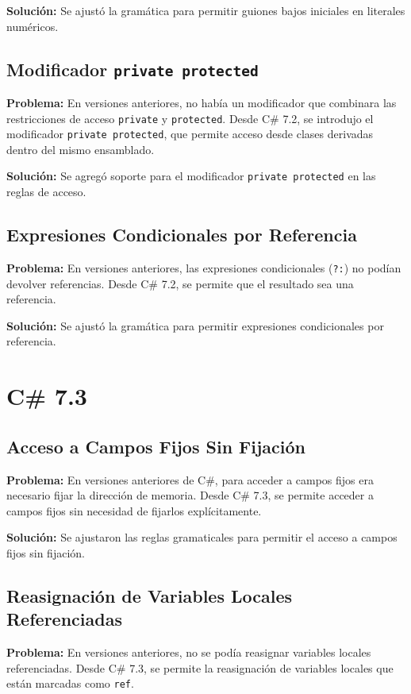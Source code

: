 \textbf{Solución:} Se ajustó la gramática para permitir guiones bajos iniciales en literales numéricos.

\subsection{Modificador \texttt{private protected}}
\textbf{Problema:} En versiones anteriores, no había un modificador que combinara las restricciones de acceso \texttt{private} y \texttt{protected}. Desde C\# 7.2, se introdujo el modificador \texttt{private protected}, que permite acceso desde clases derivadas dentro del mismo ensamblado.

\textbf{Solución:} Se agregó soporte para el modificador \texttt{private protected} en las reglas de acceso.

\subsection{Expresiones Condicionales por Referencia}
\textbf{Problema:} En versiones anteriores, las expresiones condicionales (\texttt{?:}) no podían devolver referencias. Desde C\# 7.2, se permite que el resultado sea una referencia.

\textbf{Solución:} Se ajustó la gramática para permitir expresiones condicionales por referencia.


\section{C\# 7.3}

\subsection{Acceso a Campos Fijos Sin Fijación}
\textbf{Problema:} En versiones anteriores de C\#, para acceder a campos fijos era necesario fijar la dirección de memoria. Desde C\# 7.3, se permite acceder a campos fijos sin necesidad de fijarlos explícitamente.

\textbf{Solución:} Se ajustaron las reglas gramaticales para permitir el acceso a campos fijos sin fijación.

\subsection{Reasignación de Variables Locales Referenciadas}
\textbf{Problema:} En versiones anteriores, no se podía reasignar variables locales referenciadas. Desde C\# 7.3, se permite la reasignación de variables locales que están marcadas como \texttt{ref}.

